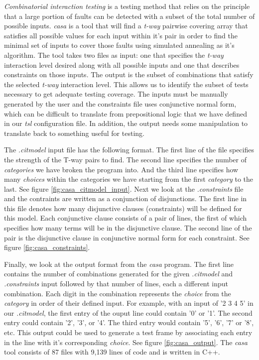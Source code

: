 \documentclass[a4full,12pt]{article}
\begin{document}
\emph{Combinatorial interaction testing} is a testing method that relies on the principle
  that a large portion of faults can be detected with a subset of the total number of 
  possible inputs. \emph{casa} is a tool that will find a \emph{t-way} pairwise covering 
  array that satisfies all possible values for each input within it's pair in order to find
  the minimal set of inputs to cover those faults using simulated annealing as it's algorithm.
  The tool takes two files as input: one that specifies the \emph{t-way} interaction
  level desired along with all possible inputs and one that describes constraints on those
  inputs. The output is the subset of combinations that satisfy the selected \emph{t-way}
  interaction level. This allows us to identify the subset of tests necessary to get adequate
  testing coverage. The inputs must be manually generated by the user and the constraints
  file uses conjunctive normal form, which can be difficult to translate from prepositional
  logic that we have defined in our \emph{tsl} configuration file. In addition, the output
  needs some manipulation to translate back to something useful for testing.
  
The \emph{.citmodel} input file has the following format. The first line of the file
  specifies the strength of the T-way pairs to find. The second line specifies the number
  of \emph{categories} we have broken the program into. And the third line specifies how
  many \emph{choices} within the categories we have starting from the first \emph{category} to
  the last. See figure \ref{fig:casa_citmodel_input}. Next we look at the \emph{.constraints}
  file and the contraints are written as a conjunction of disjunctions. The first line in this
  file denotes how many disjunctive clauses (constraints) will be defined for this model. Each
  conjunctive clause consists of a pair of lines, the first of which specifies how many terms
  will be in the disjunctive clause. The second line of the pair is the disjunctive clause in
  conjunctive normal form for each constraint. See figure \ref{fig:casa_constraints}.

Finally, we look at the output format from the \emph{casa} program. The first line contains
  the number of combinations generated for the given \emph{.citmodel} and \emph{.constraints}
  input followed by that number of lines, each a different input combination. Each digit in
  the combination represents the \emph{choice} from the \emph{category} in order of their
  defined input. For example, with an input of '2 3 4 5' in our \emph{.citmodel}, the first
  entry of the ouput line could contain '0' or '1'. The second entry could contain '2', '3',
  or '4'. The third entry would contain '5', '6', '7' or '8', etc. This output could be used
  to generate a test frame by associating each entry in the line with it's corresponding
  \emph{choice}. See figure \ref{fig:casa_output}. The \emph{casa} tool consists of 87 files
  with 9,139 lines of code and is written in C++.
  
\end{document}
